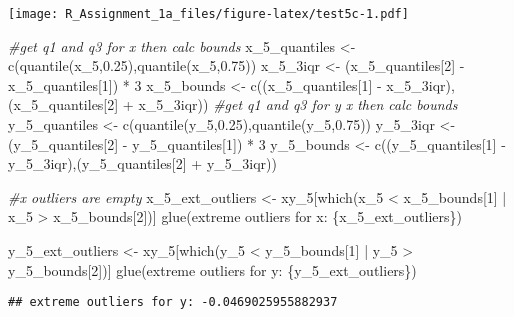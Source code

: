 \documentclass[
]{article}
\newenvironment{Shaded}{\begin{snugshade}}{\end{snugshade}}
\newcommand{\CommentTok}[1]{\textcolor[rgb]{0.56,0.35,0.01}{\textit{#1}}}
\newcommand{\DecValTok}[1]{\textcolor[rgb]{0.00,0.00,0.81}{#1}}
\newcommand{\FloatTok}[1]{\textcolor[rgb]{0.00,0.00,0.81}{#1}}
\newcommand{\FunctionTok}[1]{\textcolor[rgb]{0.00,0.00,0.00}{#1}}
\newcommand{\NormalTok}[1]{#1}
\newcommand{\OtherTok}[1]{\textcolor[rgb]{0.56,0.35,0.01}{#1}}
\newcommand{\SpecialCharTok}[1]{\textcolor[rgb]{0.00,0.00,0.00}{#1}}
\newcommand{\StringTok}[1]{\textcolor[rgb]{0.31,0.60,0.02}{#1}}
\begin{document}
\texttt{[image: R\_Assignment\_1a\_files/figure-latex/test5c-1.pdf]}

\begin{Shaded}
\begin{Highlighting}[]
\CommentTok{\#get q1 and q3 for x then calc bounds}
\NormalTok{x\_5\_quantiles }\OtherTok{\textless{}{-}} \FunctionTok{c}\NormalTok{(}\FunctionTok{quantile}\NormalTok{(x\_5,}\FloatTok{0.25}\NormalTok{),}\FunctionTok{quantile}\NormalTok{(x\_5,}\FloatTok{0.75}\NormalTok{))}
\NormalTok{x\_5\_3iqr }\OtherTok{\textless{}{-}}\NormalTok{ (x\_5\_quantiles[}\DecValTok{2}\NormalTok{] }\SpecialCharTok{{-}}\NormalTok{ x\_5\_quantiles[}\DecValTok{1}\NormalTok{]) }\SpecialCharTok{*} \DecValTok{3}
\NormalTok{x\_5\_bounds }\OtherTok{\textless{}{-}} \FunctionTok{c}\NormalTok{((x\_5\_quantiles[}\DecValTok{1}\NormalTok{] }\SpecialCharTok{{-}}\NormalTok{  x\_5\_3iqr),(x\_5\_quantiles[}\DecValTok{2}\NormalTok{] }\SpecialCharTok{+}\NormalTok{ x\_5\_3iqr))}
\CommentTok{\#get q1 and q3 for y x then calc bounds}
\NormalTok{y\_5\_quantiles }\OtherTok{\textless{}{-}} \FunctionTok{c}\NormalTok{(}\FunctionTok{quantile}\NormalTok{(y\_5,}\FloatTok{0.25}\NormalTok{),}\FunctionTok{quantile}\NormalTok{(y\_5,}\FloatTok{0.75}\NormalTok{))}
\NormalTok{y\_5\_3iqr }\OtherTok{\textless{}{-}}\NormalTok{ (y\_5\_quantiles[}\DecValTok{2}\NormalTok{] }\SpecialCharTok{{-}}\NormalTok{ y\_5\_quantiles[}\DecValTok{1}\NormalTok{]) }\SpecialCharTok{*} \DecValTok{3}
\NormalTok{y\_5\_bounds }\OtherTok{\textless{}{-}} \FunctionTok{c}\NormalTok{((y\_5\_quantiles[}\DecValTok{1}\NormalTok{] }\SpecialCharTok{{-}}\NormalTok{  y\_5\_3iqr),(y\_5\_quantiles[}\DecValTok{2}\NormalTok{] }\SpecialCharTok{+}\NormalTok{ y\_5\_3iqr))}

\CommentTok{\#x outliers are empty}
\NormalTok{x\_5\_ext\_outliers }\OtherTok{\textless{}{-}}\NormalTok{ xy\_5[}\FunctionTok{which}\NormalTok{(x\_5 }\SpecialCharTok{\textless{}}\NormalTok{ x\_5\_bounds[}\DecValTok{1}\NormalTok{] }\SpecialCharTok{|}\NormalTok{ x\_5 }\SpecialCharTok{\textgreater{}}\NormalTok{ x\_5\_bounds[}\DecValTok{2}\NormalTok{])]}
\FunctionTok{glue}\NormalTok{(}\StringTok{\textquotesingle{}extreme outliers for x: \{x\_5\_ext\_outliers\}\textquotesingle{}}\NormalTok{)}

\NormalTok{y\_5\_ext\_outliers }\OtherTok{\textless{}{-}}\NormalTok{ xy\_5[}\FunctionTok{which}\NormalTok{(y\_5 }\SpecialCharTok{\textless{}}\NormalTok{ y\_5\_bounds[}\DecValTok{1}\NormalTok{] }\SpecialCharTok{|}\NormalTok{ y\_5 }\SpecialCharTok{\textgreater{}}\NormalTok{ y\_5\_bounds[}\DecValTok{2}\NormalTok{])]}
\FunctionTok{glue}\NormalTok{(}\StringTok{\textquotesingle{}extreme outliers for y: \{y\_5\_ext\_outliers\}\textquotesingle{}}\NormalTok{)}
\end{Highlighting}
\end{Shaded}

\begin{verbatim}
## extreme outliers for y: -0.0469025955882937
\end{verbatim}
\end{document}
